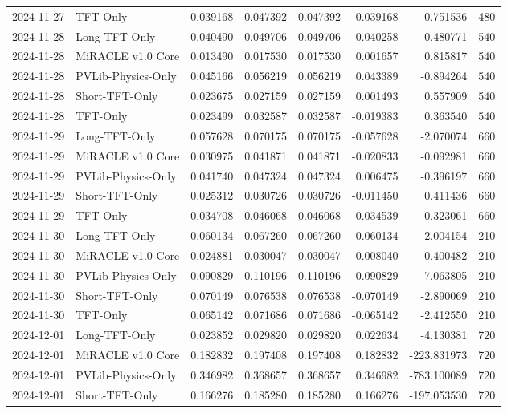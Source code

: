 \begin{tabular}{llrrrrrr}
2024-11-27 & TFT-Only & 0.039168 & 0.047392 & 0.047392 & -0.039168 & -0.751536 & 480 \\
2024-11-28 & Long-TFT-Only & 0.040490 & 0.049706 & 0.049706 & -0.040258 & -0.480771 & 540 \\
2024-11-28 & MiRACLE v1.0 Core & 0.013490 & 0.017530 & 0.017530 & 0.001657 & 0.815817 & 540 \\
2024-11-28 & PVLib-Physics-Only & 0.045166 & 0.056219 & 0.056219 & 0.043389 & -0.894264 & 540 \\
2024-11-28 & Short-TFT-Only & 0.023675 & 0.027159 & 0.027159 & 0.001493 & 0.557909 & 540 \\
2024-11-28 & TFT-Only & 0.023499 & 0.032587 & 0.032587 & -0.019383 & 0.363540 & 540 \\
2024-11-29 & Long-TFT-Only & 0.057628 & 0.070175 & 0.070175 & -0.057628 & -2.070074 & 660 \\
2024-11-29 & MiRACLE v1.0 Core & 0.030975 & 0.041871 & 0.041871 & -0.020833 & -0.092981 & 660 \\
2024-11-29 & PVLib-Physics-Only & 0.041740 & 0.047324 & 0.047324 & 0.006475 & -0.396197 & 660 \\
2024-11-29 & Short-TFT-Only & 0.025312 & 0.030726 & 0.030726 & -0.011450 & 0.411436 & 660 \\
2024-11-29 & TFT-Only & 0.034708 & 0.046068 & 0.046068 & -0.034539 & -0.323061 & 660 \\
2024-11-30 & Long-TFT-Only & 0.060134 & 0.067260 & 0.067260 & -0.060134 & -2.004154 & 210 \\
2024-11-30 & MiRACLE v1.0 Core & 0.024881 & 0.030047 & 0.030047 & -0.008040 & 0.400482 & 210 \\
2024-11-30 & PVLib-Physics-Only & 0.090829 & 0.110196 & 0.110196 & 0.090829 & -7.063805 & 210 \\
2024-11-30 & Short-TFT-Only & 0.070149 & 0.076538 & 0.076538 & -0.070149 & -2.890069 & 210 \\
2024-11-30 & TFT-Only & 0.065142 & 0.071686 & 0.071686 & -0.065142 & -2.412550 & 210 \\
2024-12-01 & Long-TFT-Only & 0.023852 & 0.029820 & 0.029820 & 0.022634 & -4.130381 & 720 \\
2024-12-01 & MiRACLE v1.0 Core & 0.182832 & 0.197408 & 0.197408 & 0.182832 & -223.831973 & 720 \\
2024-12-01 & PVLib-Physics-Only & 0.346982 & 0.368657 & 0.368657 & 0.346982 & -783.100089 & 720 \\
2024-12-01 & Short-TFT-Only & 0.166276 & 0.185280 & 0.185280 & 0.166276 & -197.053530 & 720 \\

\end{tabular}
